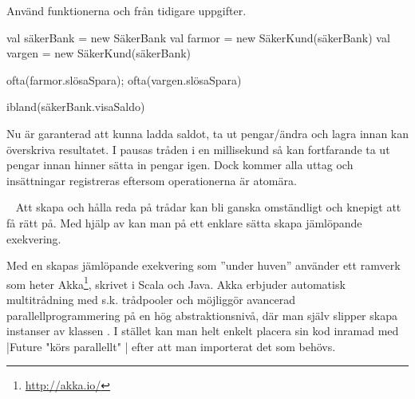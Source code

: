 Använd funktionerna  och  från tidigare uppgifter.
\begin{REPL}
val säkerBank = new SäkerBank
val farmor = new SäkerKund(säkerBank)
val vargen = new SäkerKund(säkerBank)

ofta(farmor.slösaSpara); ofta(vargen.slösaSpara)

ibland(säkerBank.visaSaldo)
\end{REPL}





\SOLUTION


\TaskSolved \what

Nu är  garanterad att kunna ladda saldot, ta ut pengar/ändra och lagra innan  kan överskriva resultatet. I  pausas tråden i en millisekund så  kan fortfarande ta ut pengar innan  hinner sätta in pengar igen. Dock kommer alla uttag och insättningar registreras eftersom operationerna är atomära.


\QUESTEND







\QUESTBEGIN

\Task \label{task:future} \what~   Att skapa och hålla reda på trådar kan bli ganska omständligt och knepigt att få rätt på.
Med hjälp av  kan man på ett enklare sätta skapa jämlöpande exekvering.

\begin{Background}
Med en  skapas jämlöpande exekvering som ''under huven'' använder ett ramverk som heter Akka\footnote{\url{http://akka.io/}}, skrivet i Scala och Java. Akka erbjuder automatisk  multitrådning med s.k. trådpooler och möjliggör avancerad parallellprogrammering på en hög  abstraktionsnivå, där man själv slipper skapa instanser av klassen . I stället kan man helt enkelt placera sin kod inramad med \code|Future{ "körs parallellt" }| efter att man importerat det som behövs.
\end{Background}

